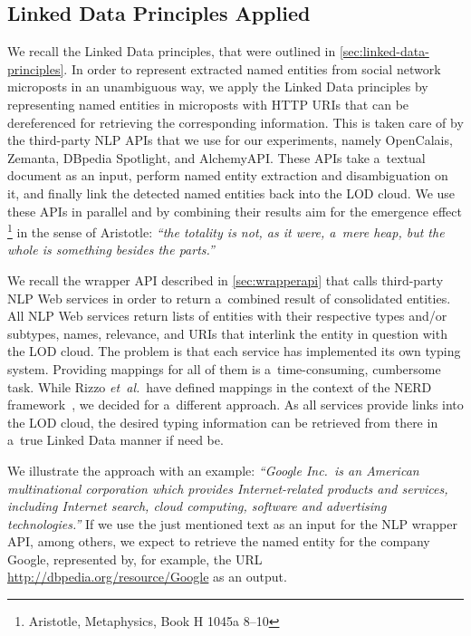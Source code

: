 \subsection{Linked Data Principles Applied}

We recall the Linked Data principles, that were outlined
in \autoref{sec:linked-data-principles}.
In order to represent extracted named entities from
social network microposts in an unambiguous way,
we apply the Linked Data principles
by representing named entities in microposts with HTTP URIs
that can be dereferenced for retrieving the corresponding information.
This is taken care of by the third-party NLP APIs
that we use for our experiments, namely OpenCalais,
Zemanta, DBpedia Spotlight, and AlchemyAPI.
These APIs take a~textual document as an input,
perform named entity extraction and disambiguation on it,
and finally link the detected named entities back
into the LOD cloud.
We use these APIs in parallel and by combining their results
aim for the emergence effect%
\footnote{Aristotle, Metaphysics, Book H 1045a 8--10}
in the sense of Aristotle:
\textit{``the totality is not, as it were, a~mere heap,
but the whole is something besides the
parts.''}

We recall the wrapper API described in \autoref{sec:wrapperapi}
that calls third-party NLP Web services
in order to return a~combined result of consolidated entities.
All NLP Web services return lists of entities with
their respective types and/or subtypes, names,
relevance, and URIs that interlink the entity in question
with the LOD cloud.
The problem is that each service has implemented
its own typing system.
Providing mappings for all of them
is a~time-consuming, cumbersome task.
While Rizzo \emph{et~al.}\ have defined mappings in the context
of the NERD framework~\cite{rizzo2011nerd,rizzo2012nerd},
we decided for a~different approach.
As all services provide links into the LOD cloud,
the desired typing information can be retrieved from there
in a~true Linked Data manner if need be.

We illustrate the approach with an example:
\textit{``Google Inc.\ is an American multinational corporation
which provides Internet-related products and services,
including Internet search, cloud computing, software and
advertising technologies.''}
If we use the just mentioned text
as an input for the NLP wrapper API,
among others, we expect to retrieve the named entity for the
company Google, represented by, for example, the URL
\url{http://dbpedia.org/resource/Google} as an output.

